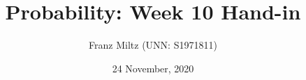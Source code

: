 \documentclass{article}
\begin{document}
\title{Probability: Week 10 Hand-in}
\author{Franz Miltz (UNN: S1971811)}
\date{24 November, 2020}
\maketitle
\end{document}
